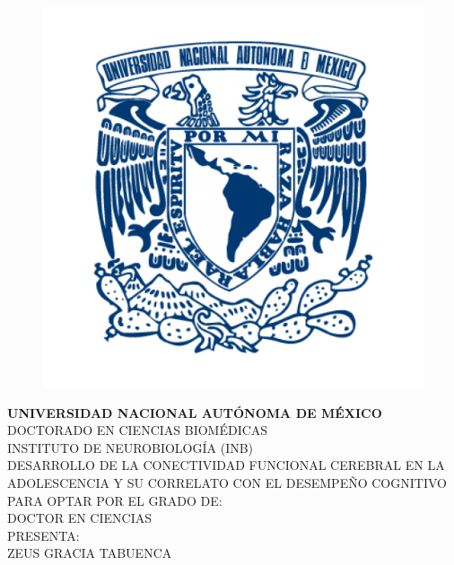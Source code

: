 \documentclass[12pt,spanish]{article}
\begin{document}

\begin{titlepage}

\begin{center}

\begin{figure}[h!]
  \centering
  \includegraphics[scale=0.25]{01-unam.png}
\end{figure}

\textbf{UNIVERSIDAD NACIONAL AUTÓNOMA DE MÉXICO}\\
DOCTORADO EN CIENCIAS BIOMÉDICAS\\
INSTITUTO DE NEUROBIOLOGÍA (INB)\\[0.70cm]

DESARROLLO DE LA CONECTIVIDAD FUNCIONAL CEREBRAL EN LA ADOLESCENCIA Y SU CORRELATO CON EL DESEMPEÑO COGNITIVO\\[0.70cm]

PARA OPTAR POR EL GRADO DE:\\
DOCTOR EN CIENCIAS\\[0.70cm]

PRESENTA:\\
ZEUS GRACIA TABUENCA\\[0.70cm]


\end{center}
\end{titlepage}
\end{document}
